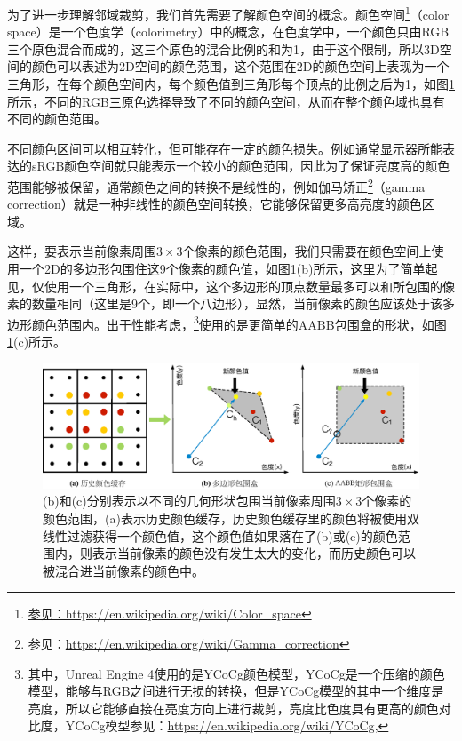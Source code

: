 为了进一步理解邻域裁剪，我们首先需要了解颜色空间的概念。颜色空间\footnote{\url{参见：https://en.wikipedia.org/wiki/Color_space}}（color space）是一个色度学（colorimetry）中的概念，在色度学中，一个颜色只由RGB三个原色混合而成的，这三个原色的混合比例的和为1，由于这个限制，所以3D空间的颜色可以表述为2D空间的颜色范围，这个范围在2D的颜色空间上表现为一个三角形，在每个颜色空间内，每个颜色值到三角形每个顶点的比例之后为1，如图\ref{f:shade-clamping}所示，不同的RGB三原色选择导致了不同的颜色空间，从而在整个颜色域也具有不同的颜色范围。

不同颜色区间可以相互转化，但可能存在一定的颜色损失。例如通常显示器所能表达的sRGB颜色空间就只能表示一个较小的颜色范围，因此为了保证亮度高的颜色范围能够被保留，通常颜色之间的转换不是线性的，例如伽马矫正\footnote{参见：\url{https://en.wikipedia.org/wiki/Gamma_correction}}（gamma correction）就是一种非线性的颜色空间转换，它能够保留更多高亮度的颜色区域。

这样，要表示当前像素周围$3\times 3$个像素的颜色范围，我们只需要在颜色空间上使用一个2D的多边形包围住这9个像素的颜色值，如图\ref{f:shade-clamping}(b)所示，这里为了简单起见，仅使用一个三角形，在实际中，这个多边形的顶点数量最多可以和所包围的像素的数量相同（这里是9个，即一个八边形），显然，当前像素的颜色应该处于该多边形颜色范围内。出于性能考虑，\cite{a:AnExcursioninTemporalSupersampling,a:RealtimeglobalilluminationandreflectionsinDust514,a:TemporalAntialiasingInUncharted4}\footnote{其中，Unreal Engine 4使用的是YCoCg颜色模型，YCoCg是一个压缩的颜色模型，能够与RGB之间进行无损的转换，但是YCoCg模型的其中一个维度是亮度，所以它能够直接在亮度方向上进行裁剪，亮度比色度具有更高的颜色对比度，YCoCg模型参见：\url{https://en.wikipedia.org/wiki/YCoCg},}使用的是更简单的AABB包围盒的形状，如图\ref{f:shade-clamping}(c)所示。

\begin{figure}
\begin{fullwidth}
	\includegraphics[width=\thewidth]{figures/shade/clamping}
	\caption{(b)和(c)分别表示以不同的几何形状包围当前像素周围$3\times 3$个像素的颜色范围，(a)表示历史颜色缓存，历史颜色缓存里的颜色将被使用双线性过滤获得一个颜色值，这个颜色值如果落在了(b)或(c)的颜色范围内，则表示当前像素的颜色没有发生太大的变化，而历史颜色可以被混合进当前像素的颜色中。}
	\label{f:shade-clamping}
\end{fullwidth}
\end{figure}

